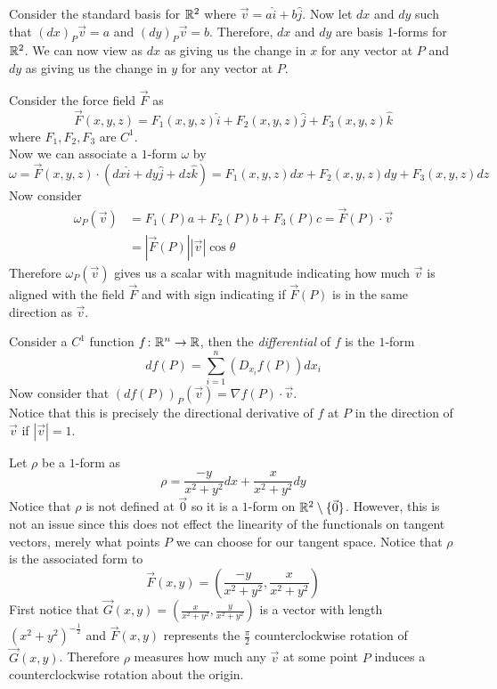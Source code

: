 \documentclass[notes.tex]{subfiles}
\begin{document}
\begin{example}
    Consider the standard basis for $\mathbb{R}^2$ where $\vec{v} = a\hat{i} + b\hat{j}$. Now let $dx$ and $dy$ such that $(dx)_P\vec{v} = a$ and $(dy)_P\vec{v} = b$. Therefore, $dx$ and $dy$ are basis $1$-forms for $\mathbb{R}^2$. We can now view as $dx$ as giving us the change in $x$ for any vector at $P$ and $dy$ as giving us the change in $y$ for any vector at $P$.
\end{example}

\begin{example}
    Consider the force field $\vec{F}$ as
    \[
        \vec{F}(x, y, z) = F_1(x, y, z)\hat{i} + F_2(x, y, z)\hat{j} + F_3(x, y, z)\hat{k}
    \]
    where $F_1, F_2, F_3$ are $C^1$. \\
    Now we can associate a $1$-form $\omega$ by
    \[
        \omega = \vec{F}(x, y, z)\cdot(dx\hat{i} + dy\hat{j} + dz\hat{k}) = F_1(x, y, z)dx + F_2(x, y, z)dy + F_3(x, y, z)dz
    \]
    Now consider
    \begin{align*}
        \omega_P(\vec{v})
        &= F_1(P)a + F_2(P)b + F_3(P)c
        = \vec{F}(P)\cdot\vec{v} \\
        &= |\vec{F}(P)||\vec{v}|\cos\theta
    \end{align*}
    Therefore $\omega_P(\vec{v})$ gives us a scalar with magnitude indicating how much $\vec{v}$ is aligned with the field $\vec{F}$ and with sign indicating if $\vec{F}(P)$ is in the same direction as $\vec{v}$.
\end{example}

\begin{definition}[Differential]
    Consider a $C^1$ function $f\colon \mathbb{R}^n \to \mathbb{R}$, then the \textit{differential} of $f$ is the $1$-form
    \[
        df(P) = \sum_{i = 1}^n (D_{x_i}f(P)) dx_i
    \]
    Now consider that $(df(P))_P(\vec{v}) = \nabla f(P)\cdot \vec{v}$. \\
    Notice that this is precisely the directional derivative of $f$ at $P$ in the direction of $\vec{v}$ if $|\vec{v}| = 1$.
\end{definition}

\begin{example}
    Let $\rho$ be a $1$-form as
    \[
        \rho = \frac{-y}{x^2 + y^2}dx + \frac{x}{x^2 + y^2}dy
    \]
    Notice that $\rho$ is not defined at $\vec{0}$ so it is a $1$-form on $\mathbb{R}^2 \setminus \{ \vec{0} \}$. However, this is not an issue since this does not effect the linearity of the functionals on tangent vectors, merely what points $P$ we can choose for our tangent space. Notice that $\rho$ is the associated form to
    \[
        \vec{F}(x, y) = \left( \frac{-y}{x^2 + y^2}, \frac{x}{x^2 + y^2} \right)
    \]
    First notice that $\vec{G}(x, y) =\left( \frac{x}{x^2 + y^2}, \frac{y}{x^2 + y^2} \right)$ is a vector with length $(x^2 + y^2)^{-\frac{1}{2}}$ and $\vec{F}(x, y)$ represents the $\frac{\pi}{2}$ counterclockwise rotation of $\vec{G}(x, y)$. Therefore $\rho$ measures how much any $\vec{v}$ at some point $P$ induces a counterclockwise rotation about the origin.
\end{example}
\end{document}
